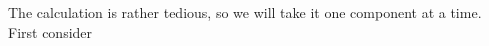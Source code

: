 \documentclass[english, parskip=full]{scrartcl}
\begin{document}
%
The calculation is rather tedious, so we will take it one component at a time.
First consider
\end{document}
